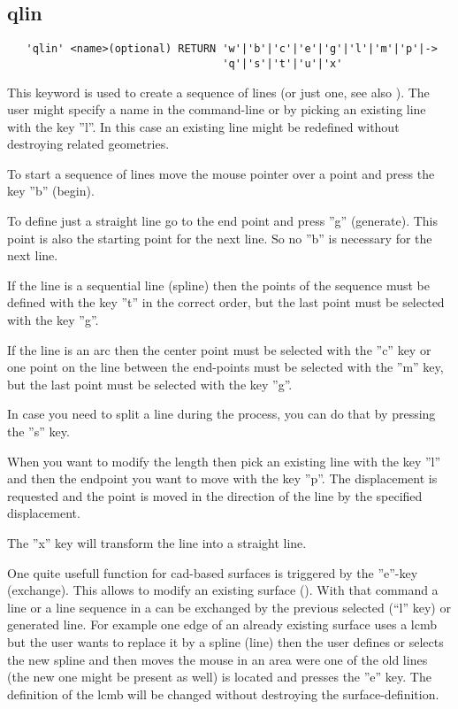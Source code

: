 \documentclass{article}
\begin{document}
\subsection{\label{qlin}qlin}
\begin{verbatim}
   'qlin' <name>(optional) RETURN 'w'|'b'|'c'|'e'|'g'|'l'|'m'|'p'|->
                                  'q'|'s'|'t'|'u'|'x'
\end{verbatim}
This keyword is used to create a sequence of lines (or just one, see also ). The user might specify a name in the command-line or by picking an existing line with the key ''l''. In this case an existing line might be redefined without destroying related geometries.

To start a sequence of lines move the mouse pointer over a point and press the key ''b'' (begin).

To define just a straight line go to the end point and press ''g'' (generate). This point is also the starting point for the next line. So no ''b'' is necessary for the next line.

If the line is a sequential line (spline) then the points of the sequence must be defined with the key ''t'' in the correct order, but the last point must be selected with the key ''g''.

If the line is an arc then the center point must be selected with the ''c'' key or one point on the line between the end-points must be selected with the ''m'' key, but the last point must be selected with the key ''g''.

In case you need to split a line during the process, you can do that by pressing the ''s'' key.

When you want to modify the length then pick an existing line with the key ''l'' and then the endpoint you want to move with the key ''p''. The displacement is requested and the point is moved in the direction of the line by the specified displacement. 

The ''x'' key will transform the line into a straight line.

One quite usefull function for cad-based surfaces is triggered by the ''e''-key (exchange). This allows to modify an existing surface (). With that command a line or a line sequence in a  can be exchanged by the previous selected (``l'' key) or generated line. For example one edge of an already existing surface uses a lcmb but the user wants to replace it by a spline (line) then the user defines or selects the new spline and then moves the mouse in an area were one of the old lines (the new one might be present as well) is located and presses the ''e'' key. The definition of the lcmb will be changed without destroying the surface-definition.
\end{document}

